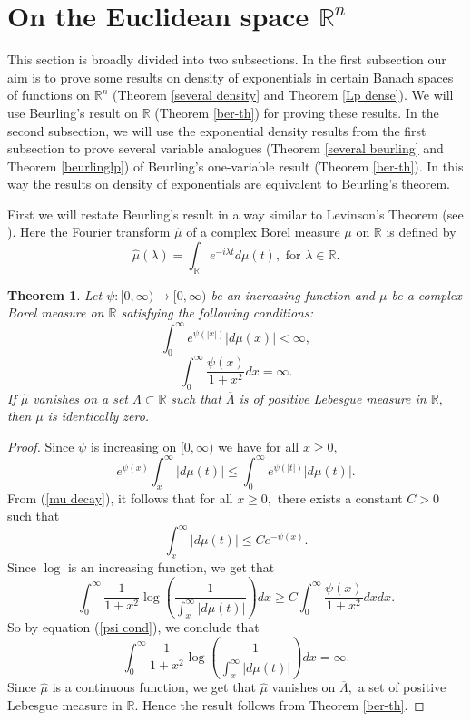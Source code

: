 \documentclass [11pt]{amsart}
\newtheorem{Thm}{Theorem}[section]
\newcommand{\R}{\mathbb R}
\newcommand{\la}{\lambda}
\numberwithin{equation}{section}
\begin{document}
\section{On the Euclidean space $\R^n$}
This section is broadly divided into two subsections. In the first subsection our aim is to prove some results on density of exponentials in certain Banach spaces of functions on $\R^n$ (Theorem \ref{several density} and Theorem \ref{Lp dense}). We will use Beurling's result on $\R$ (Theorem \ref{ber-th}) for proving these results. In the second subsection, we will use the exponential density results from the first subsection to prove several variable analogues (Theorem \ref{several beurling} and Theorem \ref{beurlinglp}) of Beurling's one-variable result (Theorem \ref{ber-th}). In this way the results on density of exponentials are equivalent to Beurling's theorem.

First we will restate Beurling's result in a way similar to Levinson's Theorem (see \cite{BRS}). Here the Fourier transform $\widehat{\mu}$ of a complex Borel measure $\mu$ on $\R$ is defined by  
$$\widehat{\mu}(\la)=\int_{\R} e^{-i\la t}d\mu(t), \text{ for } \la \in \R.$$
\begin{Thm}\label{psi-ber}
Let $\psi:[0,\infty)\rightarrow [0,\infty)$ be an increasing function  and $\mu$ be a complex Borel measure on $\R$ satisfying the following conditions:
\begin{equation}\label{mu decay}
\int_{0}^\infty e^{\psi(|x|)}|d\mu (x)|<\infty,
\end{equation}
\begin{equation}\label{psi cond}
\int_0^{\infty}\dfrac{\psi(x)}{1+x^2}dx=\infty.
\end{equation}
If $\widehat{\mu}$ vanishes on a set $\Lambda \subset \R$ such that $\overline{\Lambda}$ is of positive Lebesgue measure in $\R,$ then $\mu $ is identically zero.
\end{Thm}
\begin{proof} Since  $\psi$ is increasing on $[0,\infty)$ we have for all $x\geq 0,$
	$$e^{\psi(x)}\int_x^\infty|d\mu(t)| \leq \int_{0}^\infty e^{\psi(|t|)}|d\mu (t)|.$$
From (\ref{mu decay}), it follows that for all $x \geq 0,$ there exists a constant $C>0$ such that 
 $$\int_x^{\infty} |d\mu(t)| \leq Ce^{-\psi (x)} .$$
Since $\log$ is an increasing function, we get that
$$\int_0^{\infty}\dfrac{1}{1+x^2}\log\left(\dfrac{1}{\int_x^{\infty}|d\mu(t)|}\right)dx \geq C\int_0^{\infty}\dfrac{\psi(x)}{1+x^2}dx dx.$$
So by equation (\ref{psi cond}), we conclude that $$\int_0^{\infty}\dfrac{1}{1+x^2}\log\left(\dfrac{1}{\int_x^{\infty}|d\mu(t)|}\right)dx=\infty.$$
Since $\widehat{\mu}$ is a continuous function, we get that $\widehat{\mu}$ vanishes on $\overline{\Lambda},$ a set of positive Lebesgue measure in $\R.$ Hence the result follows from Theorem \ref{ber-th}.
\end{proof}
\end{document}

